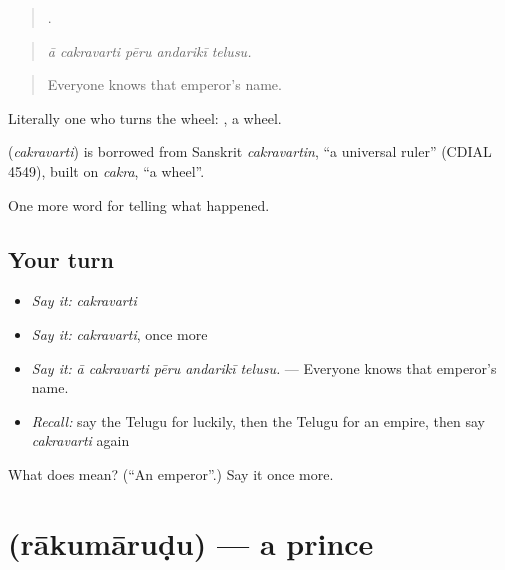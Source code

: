 \begin{quote}
    .
\end{quote}

\begin{quote}
\emph{ā cakravarti pēru andarikī telusu.}
\end{quote}

\begin{quote}
Everyone knows that emperor's name.
\end{quote}

Literally one who turns the wheel: , a wheel.

\begin{cousinweb}
\textbf{} (\emph{cakravarti}) is borrowed from Sanskrit \emph{cakravartin}, \textquotedblleft{}a universal ruler\textquotedblright{} (CDIAL 4549), built on \emph{cakra}, \textquotedblleft{}a wheel\textquotedblright{}.
\end{cousinweb}

\begin{grammarlens}[title={What you've built}]
One more word for telling what happened.
\end{grammarlens}

\subsection*{Your turn}
\begin{itemize}
\raggedright
  \item \emph{Say it:} \emph{cakravarti}
  \item \emph{Say it:} \emph{cakravarti}, once more
  \item \emph{Say it:} \emph{ā cakravarti pēru andarikī telusu.} — Everyone knows that emperor's name.
  \item \emph{Recall:} say the Telugu for luckily, then the Telugu for an empire, then say \emph{cakravarti} again
\end{itemize}

\begin{tcolorbox}[breakable,colback=teal!4,colframe=teal!35!black,title={Before you move on}]
What does  mean? (\textquotedblleft{}An emperor\textquotedblright{}.) Say it once more.
\end{tcolorbox}
\section[\texorpdfstring{\te{రాకుమారుడు} (rākumāruḍu)}{రాకుమారుడు (rākumāruḍu)}]{ (rākumāruḍu) — a prince}

